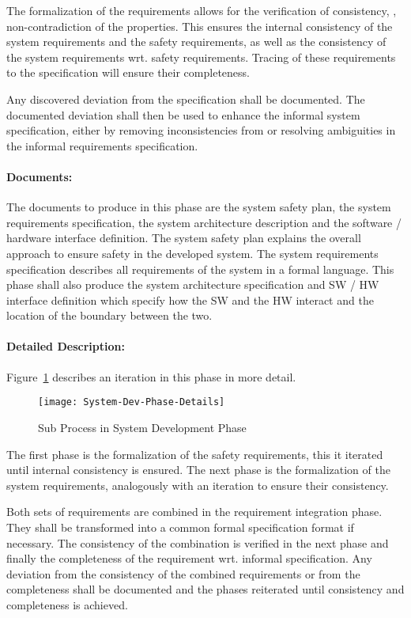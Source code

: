 The formalization of the requirements allows for the verification of
consistency, \eg, non-contradiction of the properties. This ensures the internal
consistency of the system requirements and the safety requirements, as well as
the consistency of the system requirements wrt. safety requirements. Tracing of
these requirements to the specification will ensure their completeness.

Any discovered deviation from the specification shall be documented. The
documented deviation shall then be used to enhance the informal system
specification, either by removing inconsistencies from or resolving ambiguities
in the informal requirements specification.

\paragraph{Documents:}
\label{sec:sys-dev-documents}
The documents to produce in this phase are the system safety plan, the system
requirements specification, the system architecture description and the software
/ hardware interface definition. The system safety plan explains the overall
approach to ensure safety in the developed system. The system requirements
specification describes all requirements of the system in a formal
language. This phase shall also produce the system architecture specification
and SW / HW interface definition which specify how the SW and the HW interact
and the location of the boundary between the two.


\paragraph{Detailed Description:}
\label{sec:sys-dev-deta-descr}
Figure~\ref{fig:detailed-sys-dev-phase} describes an iteration in this phase in
more detail.

\begin{figure}[ht]
  \centering
  \texttt{[image: System-Dev-Phase-Details]}
  \caption{Sub Process in System Development Phase}
  \label{fig:detailed-sys-dev-phase}
\end{figure}

The first phase is the formalization of the safety requirements, this it
iterated until internal consistency is ensured. The next phase is the
formalization of the system requirements, analogously with an iteration to
ensure their consistency.

Both sets of requirements are combined in the requirement integration
phase. They shall be transformed into a common formal specification format if
necessary. The consistency of the combination is verified in the next phase and
finally the completeness of the requirement wrt. informal specification. Any
deviation from the consistency of the combined requirements or from the
completeness shall be documented and the phases reiterated until consistency and
completeness is achieved.


